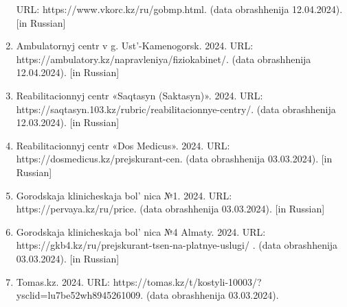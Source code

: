 \begin{references}
\begin{enumerate}
  URL: https://www.vkorc.kz/ru/gobmp.html. (data
  obrashhenija 12.04.2024). {[}in Russian{]}
\item
  Ambulatornyj centr v g. Ust'-Kamenogorsk. 2024. URL:
  https://ambulatory.kz/napravleniya/fiziokabinet/. (data obrashhenija
  12.04.2024). {[}in Russian{]}
\item
  Reabilitacionnyj centr «Saqtasyn (Saktasyn)». 2024. URL:
  https://saqtasyn.103.kz/rubric/reabilitacionnye-centry/. (data
  obrashhenija 12.03.2024). {[}in Russian{]}
\item
  Reabilitacionnyj centr «Dos Medicus». 2024. URL:
  https://dosmedicus.kz/prejskurant-cen. (data obrashhenija 03.03.2024).
  {[}in Russian{]}
\item
  Gorodskaja klinicheskaja bol' nica №1. 2024. URL:
  https://pervaya.kz/ru/price. (data obrashhenija 03.03.2024). {[}in
  Russian{]}
\item
  Gorodskaja klinicheskaja bol' nica №4 Almaty. 2024.
  URL: https://gkb4.kz/ru/prejskurant-tsen-na-platnye-uslugi/ . (data
  obrashhenija 03.03.2024). {[}in Russian{]}
\item
  Tomas.kz. 2024. URL:
  https://tomas.kz/t/kostyli-10003/?ysclid=lu7be52wh8945261009. (data
  obrashhenija 03.03.2024).
\end{enumerate}
\end{references}
